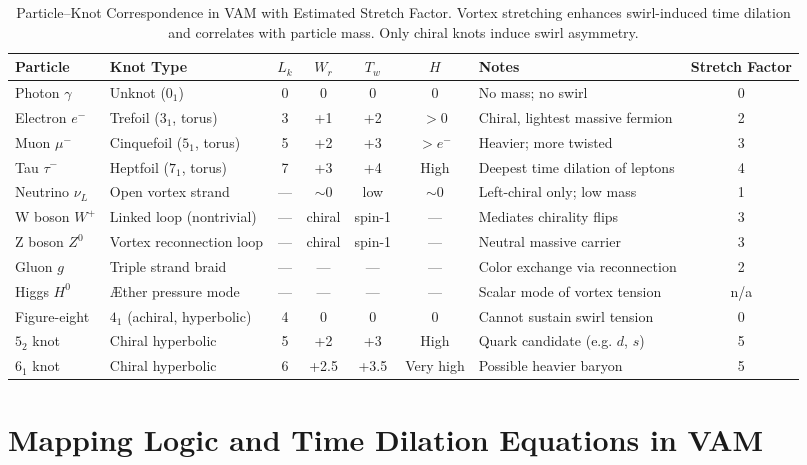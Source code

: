 \begin{table}[H]
\centering
\scriptsize
\begin{tabular}{|l|l|c|c|c|c|l|c|}
\hline
\textbf{Particle} & \textbf{Knot Type} & $L_k$ & $W_r$ & $T_w$ & $H$ & \textbf{Notes} & \textbf{Stretch Factor} \\
\hline
Photon $\gamma$ & Unknot ($0_1$) & 0 & 0 & 0 & 0 & No mass; no swirl & 0 \\
Electron $e^-$ & Trefoil ($3_1$, torus) & 3 & +1 & +2 & $>0$ & Chiral, lightest massive fermion & 2 \\
Muon $\mu^-$ & Cinquefoil ($5_1$, torus) & 5 & +2 & +3 & $>\!e^-$ & Heavier; more twisted & 3 \\
Tau $\tau^-$ & Heptfoil ($7_1$, torus) & 7 & +3 & +4 & High & Deepest time dilation of leptons & 4 \\
Neutrino $\nu_L$ & Open vortex strand & — & $\sim$0 & low & $\sim$0 & Left-chiral only; low mass & 1 \\
W boson $W^+$ & Linked loop (nontrivial) & — & chiral & spin-1 & — & Mediates chirality flips & 3 \\
Z boson $Z^0$ & Vortex reconnection loop & — & chiral & spin-1 & — & Neutral massive carrier & 3 \\
Gluon $g$ & Triple strand braid & — & — & — & — & Color exchange via reconnection & 2 \\
Higgs $H^0$ & Æther pressure mode & — & — & — & — & Scalar mode of vortex tension & n/a \\
Figure-eight & $4_1$ (achiral, hyperbolic) & 4 & 0 & 0 & 0 & Cannot sustain swirl tension & 0 \\
$5_2$ knot & Chiral hyperbolic & 5 & +2 & +3 & High & Quark candidate (e.g. $d$, $s$) & 5 \\
$6_1$ knot & Chiral hyperbolic & 6 & +2.5 & +3.5 & Very high & Possible heavier baryon & 5 \\
\hline
\end{tabular}
\caption{Particle–Knot Correspondence in VAM with Estimated Stretch Factor. Vortex stretching enhances swirl-induced time dilation and correlates with particle mass. Only chiral knots induce swirl asymmetry.}
\label{tab:stretch-factor}
\end{table}



\section*{Mapping Logic and Time Dilation Equations in VAM}

